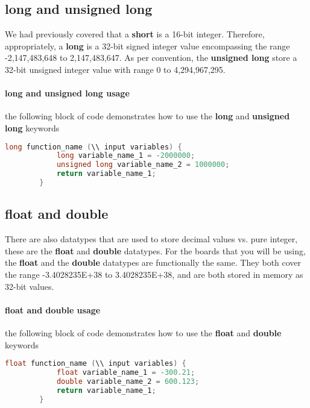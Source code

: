     \subsection{long and unsigned long}
    We had previously covered that a \textbf{short} is a 16-bit integer. Therefore, appropriately, a \textbf{long} is a 32-bit signed integer value encompassing the range -2,147,483,648 to 2,147,483,647. As
    per convention, the \textbf{unsigned long} store a 32-bit unsigned integer value with range 0 to 4,294,967,295.
    \paragraph*{long and unsigned long usage} the following block of code demonstrates how to use the \textbf{long} and \textbf{unsigned long} keywords
    \begin{lstlisting}[linewidth=1.5\textwidth, language=C++]
        long function_name (\\ input variables) {
            long variable_name_1 = -2000000;
            unsigned long variable_name_2 = 1000000;
            return variable_name_1;
        }\end{lstlisting}
    
    \subsection{float and double}
    There are also datatypes that are used to store decimal values vs. pure integer, these are the \textbf{float} and \textbf{double} datatypes. For the boards that you will be using, the \textbf{float} and
    the \textbf{double} datatypes are functionally the same. They both cover the range -3.4028235E+38 to 3.4028235E+38, and are both stored in memory as 32-bit values. 
    \paragraph*{float and double usage} the following block of code demonstrates how to use the \textbf{float} and \textbf{double} keywords
    \begin{lstlisting}[linewidth=1.5\textwidth, language=C++]
        float function_name (\\ input variables) {
            float variable_name_1 = -300.21;
            double variable_name_2 = 600.123;
            return variable_name_1;
        }\end{lstlisting}
